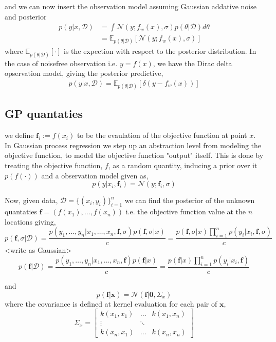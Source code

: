 and we can now insert the observation model assuming Gaussian addative noise and posterior
\begin{align*}
    p(y|x, \mathcal{D}) &= \int \mathcal{N}(y; f_{w}(x),\sigma) p(\theta| \mathcal{D}) d\theta\\
    &= \mathbb{E}_{p(\theta| \mathcal{D})}\left[\mathcal{N}(y; f_{w}(x),\sigma)\right]
\end{align*}
where $\mathbb{E}_{p(\theta| \mathcal{D})}[\cdot]$ is the expection with respect to the posterior distribution. 
In the case of noisefree observation i.e. $y=f(x)$, we have the Dirac delta opservation model, giving the
posterior predictive,
\begin{align*}
    p(y|x, \mathcal{D}) = \mathbb{E}_{p(\theta| \mathcal{D})}\left[\mathcal{\delta}(y-f_{w}(x))\right]
\end{align*}


\subsection{GP quantaties}


we define $\textbf{f}_i := f(x_i)$ to be the evaulation of the objective function 
at point $x$. In Gaussian process regression we step up an abstraction level
from modeling the objective function, to model the objective function "output" itself. 
This is done by treating the objective function, $f$, as a random quantity, inducing
a prior over it $p(f(\cdot))$ and a observation model given as, 
$$p(y|x_i,\textbf{f}_i) = \mathcal{N}(y;\textbf{f}_i,\sigma)$$

Now, given data, $\mathcal{D} =\{(x_i,y_i)\}_{i=1}^n$ we  can find the posterior of
the unknown quantaties $\textbf{f} = (f(x_1), \dots,f(x_n))$ i.e. the objective function
value at the $n$ locations giving, 
$$p(\textbf{f},\sigma|\mathcal{D}) = \frac{p(y_1,\dots,y_n|x_1,\dots,x_n,\textbf{f},\sigma)
p(\textbf{f},\sigma|x)}{c} = \frac{p(\textbf{f},\sigma|x)\prod_{i=1}^n p(y_i|x_i,\textbf{f},\sigma)
}{c} $$
 <write as Gaussian>
$$p(\textbf{f}|\mathcal{D}) = \frac{p(y_1,\dots,y_n|x_1,\dots,x_n,\textbf{f})
p(\textbf{f}|x)}{c} = \frac{p(\textbf{f}|x)\prod_{i=1}^n p(y_i|x_i,\textbf{f})
}{c} $$

and 
$$p(\textbf{f}|\textbf{x}) = \mathcal{N}(\textbf{f}|\textbf{0}, \Sigma_x)$$
where the covariance is defined at kernel evaluation for each pair of $\textbf{x}$,  $$\Sigma_x = \begin{bmatrix}
    k(x_1,x_1) & \dots & k(x_1,x_n)\\
    \vdots& \ddots\\
    k(x_n,x_1) & \dots & k(x_n,x_n)
\end{bmatrix}$$

